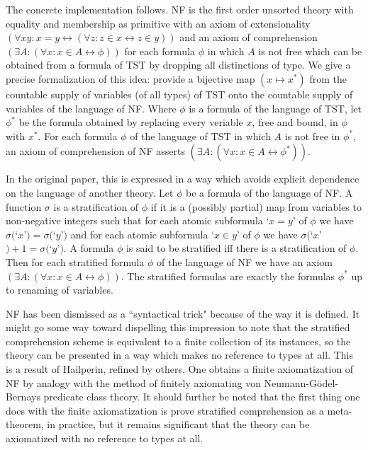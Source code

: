\documentclass[12pt]{article}
\begin{document}
The concrete implementation follows.  NF is the first order unsorted theory with equality and membership as primitive with an axiom of extensionality $(\forall xy:x=y \leftrightarrow (\forall z:z \in x \leftrightarrow z\in y))$ and an axiom of comprehension $(\exists A:(\forall x:x \in A \leftrightarrow \phi))$ for each formula $\phi$ in which $A$ is not free which can be obtained from a formula of TST by dropping all distinctions of type.  We give a precise formalization of this idea:  provide a bijective map $(x \mapsto x^*)$ from the countable supply of variables (of all types) of TST onto the countable supply of variables of the language of NF.  Where $\phi$ is a formula of the language of TST, let $\phi^*$ be the formula obtained by replacing every veriable $x$, free and bound,
in $\phi$ with $x^*$. For each formula $\phi$ of the language of TST in which $A$ is not free in $\phi^*$, an axiom of comprehension of NF asserts $(\exists A:(\forall x:x \in A \leftrightarrow \phi^*))$.

In the original paper, this is expressed in a way which avoids explicit dependence on the language of another theory.  Let $\phi$ be a formula of the language of
NF.  A function $\sigma$ is a stratification of $\phi$ if it is a (possibly partial) map from variables to non-negative integers such that for each atomic subformula
`$x=y$'  of $\phi$ we have $\sigma($`$x$'$)=\sigma($`$y$'$)$ and for each atomic subformula `$x \in y$' of $\phi$ we have $\sigma($`$x$'$)+1 = \sigma($`$y$'$)$.
A formula $\phi$ is said to be stratified iff there is a stratification of $\phi$.  Then for each stratified formula $\phi$ of the language of NF we have an axiom $(\exists A:(\forall x:x \in A \leftrightarrow \phi))$.  The stratified formulas are exactly the formulas $\phi^*$ up to renaming of variables.

NF has been dismissed as a ``syntactical trick" because of the way it is defined.  It might go some way toward dispelling this impression to note that the stratified comprehension scheme is equivalent to a finite collection of its instances, so the theory can be presented in a way which makes no reference to types at all.  This is a result of Hailperin, refined by others.  One obtains a finite axiomatization of NF by analogy with the method of finitely axiomating von Neumann-G\"odel-Bernays predicate class theory.  It should further be noted that the first thing one does with the finite axiomatization is prove stratified comprehension as a meta-theorem, in practice, but it remains significant that the theory can be axiomatized with no reference to types at all.
\end{document}
